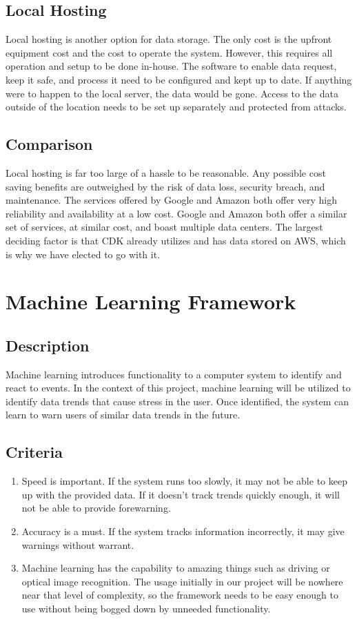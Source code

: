 \documentclass[letterpaper,10pt,onecolumn]{IEEEtran}
\begin{document}
  \subsection {Local Hosting}
    Local hosting is another option for data storage. The only cost is the upfront equipment cost and the cost to operate the system. However, this requires all operation and setup to be done in-house. The software to enable data request, keep it safe, and process it need to be configured and kept up to date. If anything were to happen to the local server, the data would be gone. Access to the data outside of the location needs to be set up separately and protected from attacks.

  \subsection {Comparison}
    Local hosting is far too large of a hassle to be reasonable. Any possible cost saving benefits are outweighed by the risk of data loss, security breach, and maintenance. The services offered by Google and Amazon both offer very high reliability and availability at a low cost. Google and Amazon both offer a similar set of services, at similar cost, and boast multiple data centers. The largest deciding factor is that CDK already utilizes and has data stored on AWS, which is why we have elected to go with it.

\section{Machine Learning Framework}
  \subsection {Description}
	Machine learning introduces functionality to a computer system to identify and react to events. In the context of this project, machine learning will be utilized to identify data trends that cause stress in the user. Once identified, the system can learn to warn users of similar data trends in the future.
  \subsection {Criteria}
    \begin{enumerate}
      \item Speed is important. If the system runs too slowly, it may not be able to keep up with the provided data. If it doesn't track trends quickly enough, it will not be able to provide forewarning.
      \item Accuracy is a must. If the system tracks information incorrectly, it may give warnings without warrant.
	  \item Machine learning has the capability to amazing things such as driving or optical image recognition. The usage initially in our project will be nowhere near that level of complexity, so the framework needs to be easy enough to use without being bogged down by unneeded functionality.
    \end{enumerate}
\end{document}
